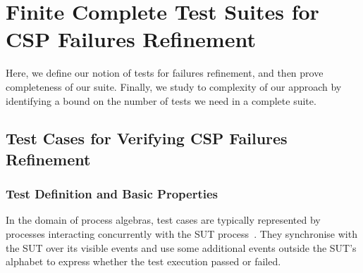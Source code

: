 \section{Finite Complete Test Suites for CSP Failures Refinement}
\label{sec:finitecompletefails}

Here, we define our notion of tests for failures refinement, and then prove
completeness of our suite. Finally, we study to complexity of our approach by
identifying a bound on the number of tests we need in a complete suite.

\subsection{Test Cases for Verifying CSP Failures Refinement}

\subsubsection*{Test Definition and Basic Properties}
In the domain of process algebras, test cases are typically represented
by processes interacting concurrently with the SUT
process~\cite{Hennessy:1988:ATP:50497}. They synchronise with the SUT over its visible events and use some additional events outside the SUT's alphabet to express whether the test execution  passed or failed. %

